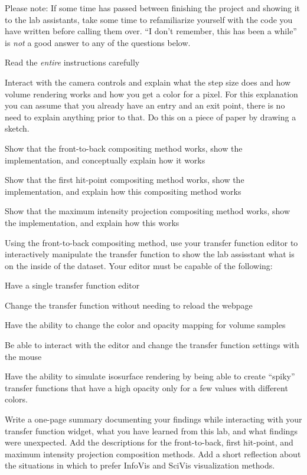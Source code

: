 \documentclass{labinstructions}
\begin{document}
Please note: If some time has passed between finishing the project and showing it to the lab assistants, take some time to refamiliarize yourself with the code you have written before calling them over.  ``I don't remember, this has been a while'' is \emph{not} a good answer to any of the questions below.
\begin{todolist}
  \item Read the \emph{entire} instructions carefully
  \item Interact with the camera controls and explain what the step size does and how volume rendering works and how you get a color for a pixel.  For this explanation you can assume that you already have an entry and an exit point, there is no need to explain anything prior to that.  Do this on a piece of paper by drawing a sketch.
  \item Show that the front-to-back compositing method works, show the implementation, and conceptually explain how it works
  \item Show that the first hit-point compositing method works, show the implementation, and explain how this compositing method works
  \item Show that the maximum intensity projection compositing method works, show the implementation, and explain how this works
  \item Using the front-to-back compositing method, use your transfer function editor to interactively manipulate the transfer function to show the lab assisstant what is on the inside of the dataset.  Your editor must be capable of the following:
  \begin{todolist}
    \item Have a single transfer function editor
    \item Change the transfer function without needing to reload the webpage
    \item Have the ability to change the color and opacity mapping for volume samples
    \item Be able to interact with the editor and change the transfer function settings with the mouse
    \item Have the ability to simulate isosurface rendering by being able to create ``spiky'' transfer functions that have a high opacity only for a few values with different colors.
  \end{todolist}
  \item Write a one-page summary documenting your findings while interacting with your transfer function widget, what you have learned from this lab, and what findings were unexpected.  Add the descriptions for the front-to-back, first hit-point, and maximum intensity projection composition methods.  Add a short reflection about the situations in which to prefer InfoVis and SciVis visualization methods. 
\end{todolist}
\end{document}

